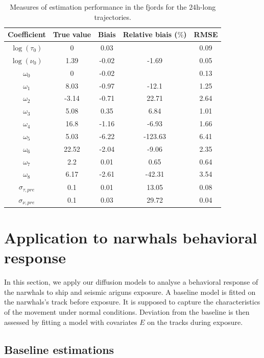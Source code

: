 \documentclass[11pt]{article}
\newcommand {\1}{\mathbb{1}}
\theoremstyle{definition}
\theoremstyle{remark}
\theoremstyle{remark}
\begin{document}
\begin{table}[H]
	\centering
	\begin{tabular}{|c|c|c|c|c|}
		\hline
		Coefficient   & True value  & Biais & Relative biais ($\%$) & RMSE \\
		\hline
		$\log(\tau_0)$   & 0     & 0.03  &         & 0.09 \\
		$\log(\nu_0)$  & 1.39  & -0.02 & -1.69     & 0.05 \\
		$\omega_0$     & 0     & -0.02 &   & 0.13 \\
		$\omega_1$ & 8.03  & -0.97 & -12.1     & 1.25 \\
		$\omega_2$ & -3.14 & -0.71 & 22.71     & 2.64 \\
		$\omega_3$ & 5.08  & 0.35  & 6.84      & 1.01 \\
		$\omega_4$ & 16.8  & -1.16 & -6.93     & 1.66 \\
		$\omega_5$ & 5.03  & -6.22 & -123.63   & 6.41 \\
		$\omega_6$ & 22.52 & -2.04 & -9.06     & 2.35 \\
		$\omega_7$ & 2.2   & 0.01  & 0.65      & 0.64 \\
		$\omega_8$ & 6.17  & -2.61 & -42.31    & 3.54 \\
		$\sigma_{\tau,pre}$   & 0.1   & 0.01  & 13.05     & 0.08 \\
		$\sigma_{\nu,pre}$    & 0.1   & 0.03  & 29.72     & 0.04 \\
		\hline
	\end{tabular}
	\caption{Measures of estimation performance in the fjords for the $24$h-long trajectories.}
\label{table: estimation performance fjords 24h}
\end{table}


\section{Application to narwhals behavioral response}


In this section, we apply our diffusion models to analyse a behavioral response of the narwhals to ship and seismic ariguns exposure.
A baseline model is fitted on the narwhals's track before exposure. It is supposed to capture the characteristics of the movement under normal conditions. Deviation from the baseline is then assessed by fitting a model with covariates $E$ on the tracks during exposure.


\subsection{Baseline estimations}
\end{document}
